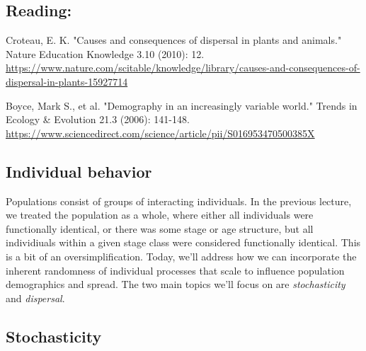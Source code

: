 \documentclass[12pt]{article}
\begin{document}
\subsection*{Reading:}

Croteau, E. K. "Causes and consequences of dispersal in plants and animals." Nature Education Knowledge 3.10 (2010): 12. \\ \url{https://www.nature.com/scitable/knowledge/library/causes-and-consequences-of-dispersal-in-plants-15927714} \\

\bigskip

Boyce, Mark S., et al. "Demography in an increasingly variable world." Trends in Ecology \& Evolution 21.3 (2006): 141-148. \\ \url{https://www.sciencedirect.com/science/article/pii/S016953470500385X}



















\begin{center}
\noindent\hrulefill 
\end{center}


\clearpage

\subsection*{Individual behavior}

Populations consist of groups of interacting individuals. In the previous lecture, we treated the population as a whole, where either all individuals were functionally identical, or there was some stage or age structure, but all individiuals within a given stage class were considered functionally identical. This is a bit of an oversimplification. Today, we'll address how we can incorporate the inherent randomness of individual processes that scale to influence population demographics and spread. The two main topics we'll focus on are \textit{stochasticity} and \textit{dispersal}.






\clearpage

\subsection*{Stochasticity}
\end{document}
